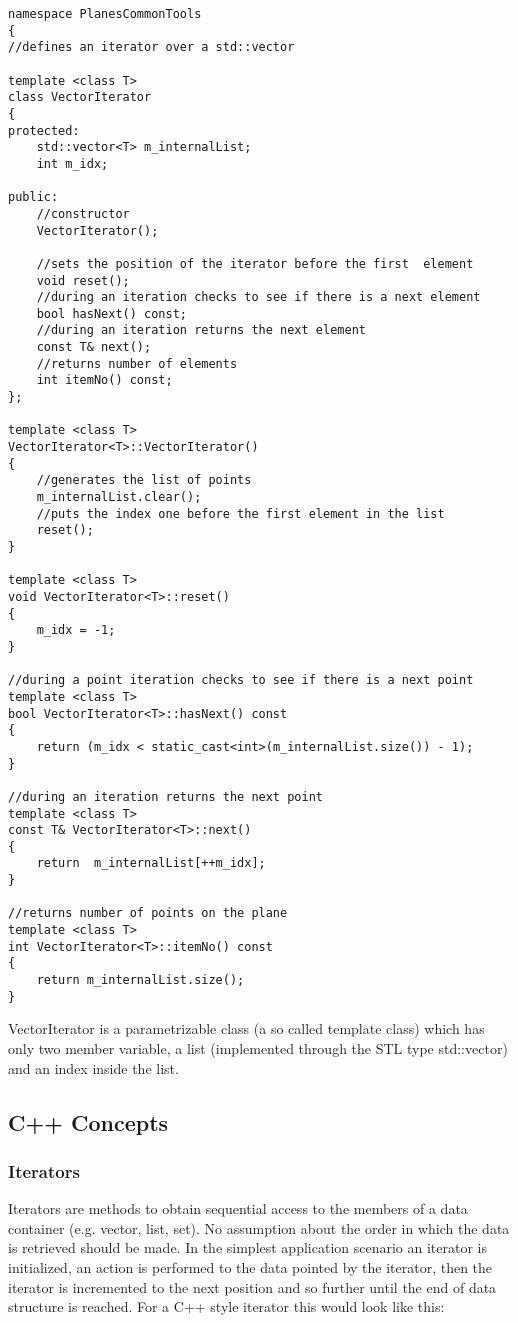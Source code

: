 \begin{lstlisting}
namespace PlanesCommonTools
{
//defines an iterator over a std::vector

template <class T>
class VectorIterator
{
protected:
    std::vector<T> m_internalList;
    int m_idx;

public:
    //constructor
    VectorIterator();

    //sets the position of the iterator before the first  element
    void reset();
    //during an iteration checks to see if there is a next element
    bool hasNext() const;
    //during an iteration returns the next element
    const T& next();
    //returns number of elements
    int itemNo() const;
};

template <class T>
VectorIterator<T>::VectorIterator()
{
    //generates the list of points
    m_internalList.clear();
    //puts the index one before the first element in the list
    reset();
}

template <class T>
void VectorIterator<T>::reset()
{
    m_idx = -1;
}

//during a point iteration checks to see if there is a next point
template <class T>
bool VectorIterator<T>::hasNext() const
{
    return (m_idx < static_cast<int>(m_internalList.size()) - 1);
}

//during an iteration returns the next point
template <class T>
const T& VectorIterator<T>::next()
{
    return  m_internalList[++m_idx];
}

//returns number of points on the plane
template <class T>
int VectorIterator<T>::itemNo() const
{
    return m_internalList.size();
}

\end{lstlisting}

VectorIterator is a parametrizable class (a so called template class) which has only two member variable, a list (implemented through the STL type std::vector) and an index inside the list. 

\subsection {C++ Concepts}
\subsubsection {Iterators}

Iterators are methods to obtain sequential access to the members of a data container (e.g. vector, list, set). No assumption about the order in which the data is retrieved should be made. In the simplest application scenario an iterator is initialized, an action is performed to the data pointed by the iterator, then the iterator is incremented to the next position and so further until the end of data structure is reached. For a C++ style iterator this would look like this:

